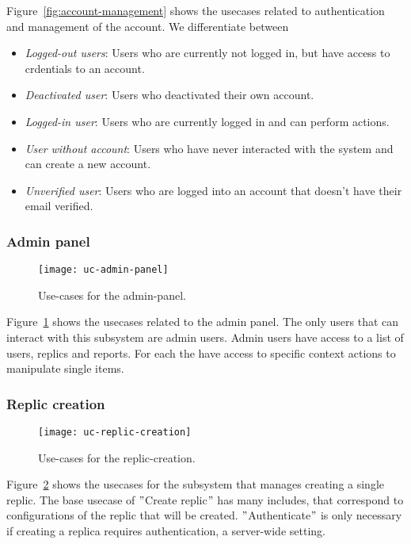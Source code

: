 Figure~\ref{fig:account-management} shows the usecases related to authentication and management of the account.
We differentiate between
\begin{itemize}
    \item \textit{Logged-out users}: Users who are currently not logged in, but have access to crdentials to an account.
    \item \textit{Deactivated user}: Users who deactivated their own account.
    \item \textit{Logged-in user}: Users who are currently logged in and can perform actions.
    \item \textit{User without account}: Users who have never interacted with the system and can create a new account.
    \item \textit{Unverified user}: Users who are logged into an account that doesn't have their email verified.
\end{itemize}

\subsubsection{Admin panel}
\begin{figure}
    \centering
    \texttt{[image: uc-admin-panel]}
    \caption{Use-cases for the admin-panel.}
    \label{fig:admin-panel}
\end{figure}

Figure~\ref{fig:admin-panel} shows the usecases related to the admin panel.
The only users that can interact with this subsystem are admin users.
Admin users have access to a list of users, replics and reports.
For each the have access to specific context actions to manipulate single items.

\subsubsection{Replic creation}
\begin{figure}
    \centering
    \texttt{[image: uc-replic-creation]}
    \caption{Use-cases for the replic-creation.}
    \label{fig:replic-creation}
\end{figure}

Figure~\ref{fig:replic-creation} shows the usecases for the subsystem that manages creating a single replic.
The base usecase of \("\)Create replic\("\) has many includes, that correspond to configurations of the replic that will be created.
\("\)Authenticate\("\) is only necessary if creating a replica requires authentication, a server-wide setting.

